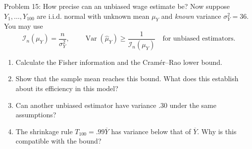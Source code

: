 \documentclass[notes,10pt, aspectratio=169]{beamer}
\newif\ifshowsolutions
\newcommand{\E}{\mathbb{E}}
\newcommand{\Var}{\operatorname{Var}}
\newcommand{\answerpart}[1]{\textcolor{blue}{\textbf{#1.}}\,}
\begin{document}
\begin{frame}{Problem 15: How precise can an unbiased wage estimate be?}
Now suppose $Y_1,\ldots,Y_{100}$ are i.i.d. normal with unknown mean $\mu_Y$ and \emph{known} variance $\sigma_Y^2=36$. You may use
\[
\mathcal I_n(\mu_Y)=\frac{n}{\sigma_Y^2},\qquad
\Var(\widehat\mu_Y)\geq\frac{1}{\mathcal I_n(\mu_Y)}
\quad\text{for unbiased estimators.}
\]
\begin{enumerate}
\setlength{\itemsep}{8pt}
\item Calculate the Fisher information and the Cram\'er--Rao lower bound.
\item Show that the sample mean reaches this bound. What does this establish about its efficiency in this model?
\item Can another unbiased estimator have variance .30 under the same assumptions?
\item The shrinkage rule $T_{100}=.99\overline Y$ has variance below that of $\overline Y$. Why is this compatible with the bound?
\end{enumerate}
\end{frame}

\ifshowsolutions
\begin{frame}{Solution 15: The normal-model precision bound}
\small
\answerpart{1}
For $n=100$ independent normal wages with known variance 36,
\[
\mathcal I_{100}(\mu_Y)=\frac{100}{36}=\frac{25}{9},
\qquad
\frac{1}{\mathcal I_{100}(\mu_Y)}=\frac9{25}=.36.
\]
The Cram\'er--Rao bound therefore requires $\Var(\widehat\mu_Y)\geq .36$ for an estimator unbiased throughout this parameter space.
\answerpart{2}
\[
\E(\overline Y)=\mu_Y,
\qquad
\Var(\overline Y)=\frac{36}{100}=.36.
\]
The sample mean attains the bound: it is \textbf{efficient among unbiased estimators in this normal model}.
\answerpart{3}An unbiased estimator with variance $.30$ would violate the bound.
\vspace{.15cm}

\answerpart{4}For $T_{100}=.99\overline Y$,
\[
\E(T_{100})=.99\mu_Y,
\qquad \operatorname{Bias}(T_{100})=-.01\mu_Y,
\qquad \Var(T_{100})=.352836.
\]
Its smaller variance is compatible with the bound because it is not unbiased for every $\mu_Y$.
\end{frame}
\fi
\end{document}
